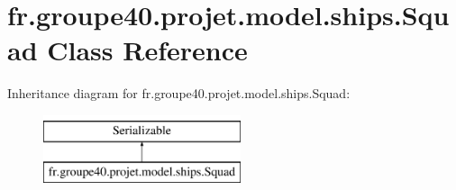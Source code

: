\hypertarget{classfr_1_1groupe40_1_1projet_1_1model_1_1ships_1_1_squad}{}\section{fr.\+groupe40.\+projet.\+model.\+ships.\+Squad Class Reference}
\label{classfr_1_1groupe40_1_1projet_1_1model_1_1ships_1_1_squad}
Inheritance diagram for fr.\+groupe40.\+projet.\+model.\+ships.\+Squad\+:\begin{figure}[H]
\begin{center}
\leavevmode
\includegraphics[height=2.000000cm]{classfr_1_1groupe40_1_1projet_1_1model_1_1ships_1_1_squad}
\end{center}
\end{figure}
